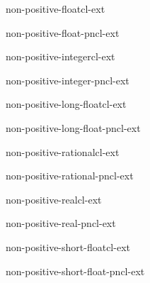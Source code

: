 \begin{type}{non-positive-float}{}{cl-ext}{}
  
\end{type}

\begin{function}{non-positive-float-p}{n}{cl-ext}{}
  
\end{function}

\begin{type}{non-positive-integer}{}{cl-ext}{}
  
\end{type}

\begin{function}{non-positive-integer-p}{n}{cl-ext}{}
  
\end{function}

\begin{type}{non-positive-long-float}{}{cl-ext}{}
  
\end{type}

\begin{function}{non-positive-long-float-p}{n}{cl-ext}{}
  
\end{function}

\begin{type}{non-positive-rational}{}{cl-ext}{}
  
\end{type}

\begin{function}{non-positive-rational-p}{n}{cl-ext}{}
  
\end{function}

\begin{type}{non-positive-real}{}{cl-ext}{}
  
\end{type}

\begin{function}{non-positive-real-p}{n}{cl-ext}{}
  
\end{function}

\begin{type}{non-positive-short-float}{}{cl-ext}{}
  
\end{type}

\begin{function}{non-positive-short-float-p}{n}{cl-ext}{}
  
\end{function}

